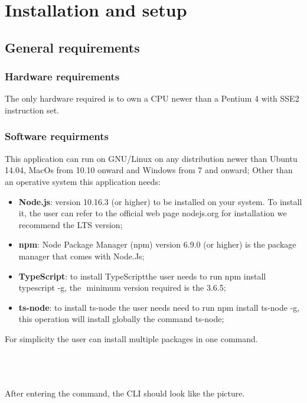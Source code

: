 \section{Installation and setup}
\subsection{General requirements}
\subsubsection{Hardware requirements}
The only hardware required is to own a CPU newer than a Pentium 4 with SSE2 instruction set. 
\subsubsection{Software requirments }
This application can run on GNU/Linux on any distribution newer than Ubuntu 14.04, MacOs from 10.10 onward and Windows from 7 and onward; Other than an operative system this application needs: 
\begin{itemize}
	\item \textbf{Node.js}: version 10.16.3 (or higher) to be installed on your system. To install it, the user can refer to the official web page nodejs.org for installation we recommend the LTS version;
	\item \textbf{npm}: Node Package Manager (npm) version 6.9.0 (or higher) is the package manager that comes with Node.Js; 
	\item \textbf{TypeScript}: to install TypeScript\glo the user needs to run npm install typescript -g, the  minimum version required is the 3.6.5; 
	\item \textbf{ts-node}: to install ts-node the user needs need to run npm install ts-node -g, this operation will install globally the command ts-node; 
\end{itemize}
For simplicity the user can install multiple packages in one command.\\\\
\centerline{}\\\\
After entering the command, the CLI should look like the picture.

